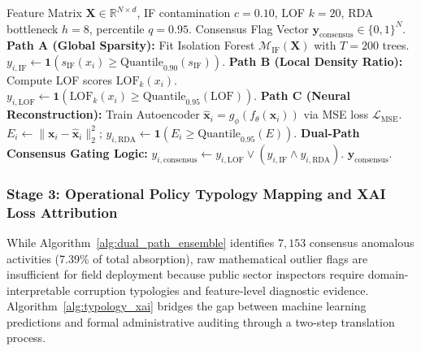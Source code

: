 \documentclass[runningheads]{llncs}
\begin{document}
\begin{algorithm}[htbp]
\caption{Dual-Path Consensus Ensemble Detection Gate}
\label{alg:dual_path_ensemble}
\begin{algorithmic}[1]
\REQUIRE Feature Matrix $\mathbf{X} \in \mathbb{R}^{N \times d}$, IF contamination $c = 0.10$, LOF $k = 20$, RDA bottleneck $h = 8$, percentile $q = 0.95$.
\ENSURE Consensus Flag Vector $\mathbf{y}_{\text{consensus}} \in \{0, 1\}^N$.
\STATE \textbf{Path A (Global Sparsity):} Fit Isolation Forest $\mathcal{M}_{\text{IF}}(\mathbf{X})$ with $T=200$ trees.
    \STATE $y_{i, \text{IF}} \leftarrow \mathbf{1}\left(s_{\text{IF}}(x_i) \ge \text{Quantile}_{0.90}(s_{\text{IF}})\right)$.
\ENDFOR
\STATE \textbf{Path B (Local Density Ratio):} Compute LOF scores $\text{LOF}_k(x_i)$.
    \STATE $y_{i, \text{LOF}} \leftarrow \mathbf{1}\left(\text{LOF}_k(x_i) \ge \text{Quantile}_{0.95}(\text{LOF})\right)$.
\ENDFOR
\STATE \textbf{Path C (Neural Reconstruction):} Train Autoencoder $\hat{\mathbf{x}}_i = g_{\phi}(f_{\theta}(\mathbf{x}_i))$ via MSE loss $\mathcal{L}_{\text{MSE}}$.
    \STATE $E_i \leftarrow \|\mathbf{x}_i - \hat{\mathbf{x}}_i\|_2^2$; \quad $y_{i, \text{RDA}} \leftarrow \mathbf{1}\left(E_i \ge \text{Quantile}_{0.95}(E)\right)$.
\ENDFOR
\STATE \textbf{Dual-Path Consensus Gating Logic:}
    \STATE $y_{i, \text{consensus}} \leftarrow y_{i, \text{LOF}} \lor \left(y_{i, \text{IF}} \land y_{i, \text{RDA}}\right)$.
\ENDFOR
\RETURN $\mathbf{y}_{\text{consensus}}$.
\end{algorithmic}
\end{algorithm}

\subsubsection{Stage 3: Operational Policy Typology Mapping and XAI Loss Attribution}
While Algorithm~\ref{alg:dual_path_ensemble} identifies $7,153$ consensus anomalous activities (7.39\% of total absorption), raw mathematical outlier flags are insufficient for field deployment because public sector inspectors require domain-interpretable corruption typologies and feature-level diagnostic evidence. Algorithm~\ref{alg:typology_xai} bridges the gap between machine learning predictions and formal administrative auditing through a two-step translation process.
\end{document}
